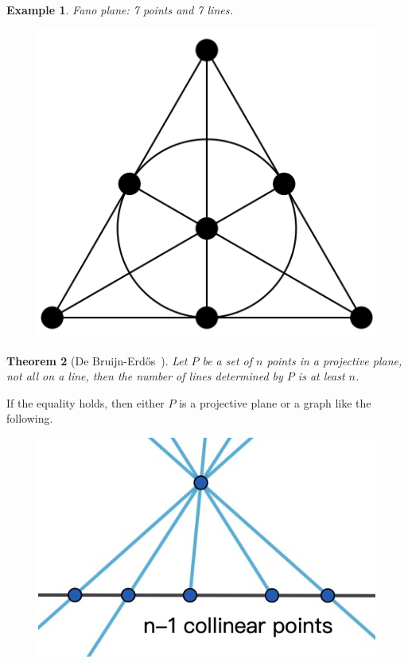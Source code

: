 \documentclass{article}
\newtheorem{theorem}{Theorem}[section]
\newtheorem{example}[theorem]{Example}
\theoremstyle{definition}
\def\Erdos{Erd\H{o}s}
\begin{document}
\begin{example}
Fano plane: 7 points and 7 lines.
 \begin{figure}[H]
        \centering
        \includegraphics[scale=0.2]{20-4.png}
    \end{figure}
\end{example}

\begin{theorem}[De Bruijn-\Erdos{}~\cite{bruijn1951colour}]
    Let $P$ be a set of $n$ points in a projective plane, not all on a line, then the number of lines determined by $P$ is at least $n$.
\end{theorem}

 If the equality holds, then either $P$ is a projective plane or a graph like the following.

     \begin{figure}[H]
        \centering
        \includegraphics[scale=0.3]{20-3.jpg}
    \end{figure}
\end{document}
